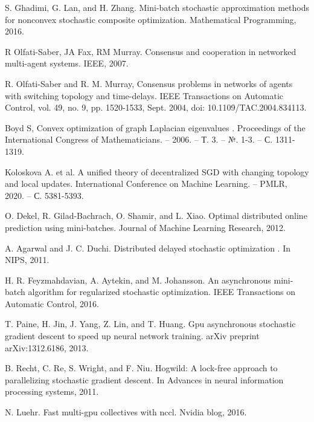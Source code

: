 \documentclass[a4paper,article,14pt]{extarticle}
\begin{document}

\begin{thebibliography}{1}
 S. Ghadimi, G. Lan, and H. Zhang. \flqq Mini-batch stochastic approximation methods for nonconvex stochastic composite optimization\frqq. Mathematical Programming, 2016.

 R Olfati-Saber, JA Fax, RM Murray. \flqq Consensus and cooperation in networked multi-agent systems\frqq. IEEE, 2007.

 R. Olfati-Saber and R. M. Murray, \flqq Consensus problems in networks of agents with switching topology and time-delays\frqq. IEEE Transactions on Automatic Control, vol. 49, no. 9, pp. 1520-1533, Sept. 2004, doi: 10.1109/TAC.2004.834113.

 Boyd S, \flqq Convex optimization of graph Laplacian eigenvalues \frqq. Proceedings of the International Congress of Mathematicians. – 2006. – Т. 3. – №. 1-3. – С. 1311-1319.

 Koloskova A. et al. \flqq A unified theory of decentralized SGD with changing topology and local updates\frqq. International Conference on Machine Learning. – PMLR, 2020. – С. 5381-5393.

 O. Dekel, R. Gilad-Bachrach, O. Shamir, and L. Xiao. \flqq Optimal distributed online prediction using mini-batches\frqq. Journal of Machine Learning Research, 2012.

 A. Agarwal and J. C. Duchi. \flqq Distributed delayed stochastic optimization \frqq. In NIPS, 2011.

 H. R. Feyzmahdavian, A. Aytekin, and M. Johansson. \flqq An asynchronous mini-batch algorithm for regularized stochastic optimization\frqq. IEEE Transactions on Automatic Control, 2016.

 T. Paine, H. Jin, J. Yang, Z. Lin, and T. Huang. \flqq Gpu asynchronous stochastic gradient descent to speed up neural network training\frqq. arXiv preprint arXiv:1312.6186, 2013.

 B. Recht, C. Re, S. Wright, and F. Niu. Hogwild: \flqq A lock-free approach to parallelizing stochastic gradient descent\frqq. In Advances in neural information processing systems, 2011.

  N. Luehr. \flqq Fast multi-gpu collectives with nccl\frqq. Nvidia blog, 2016.


\end{thebibliography}
\end{document}
